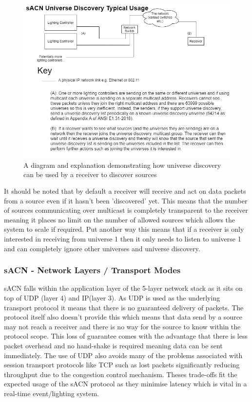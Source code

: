 \documentclass[11pt,a4paper]{article}
\begin{document}
\begin{figure}[H]
	\includegraphics[width=\textwidth]{CS4099-Discovery-Explaination}
	\caption{A diagram and explanation demonstrating how universe discovery can be used by a receiver to discover sources}
	\label{UNI_DISCOVERY_DESC}
\end{figure}

It should be noted that by default a receiver will receive and act on data packets from a source even if it hasn't been 'discovered' yet. This means that the number of sources communicating over multicast is completely transparent to the receiver meaning it places no limit on the number of allowed sources which allows the system to scale if required. Put another way this means that if a receiver is only interested in receiving from universe 1 then it only needs to listen to universe 1 and can completely ignore other universes and universe discovery.

\subsubsection{sACN - Network Layers / Transport Modes}
sACN falls within the application layer of the 5-layer network stack as it sits on top of UDP (layer 4) and IP(layer 3). As UDP is used as the underlying transport protocol it means that there is no guaranteed delivery of packets. The protocol itself also doesn't provide this which means that data send by a source may not reach a receiver and there is no way for the source to know within the protocol scope. This loss of guarantee comes with the advantage that there is less packet overhead and no hand-shake is required meaning data can be sent immediately. The use of UDP also avoids many of the problems associated with session transport protocols like TCP such as lost packets significantly reducing throughput due to the congestion control mechanism. Theses trade-offs fit the expected usage of the sACN protocol as they minimise latency which is vital in a real-time event/lighting system. \\
\end{document}

